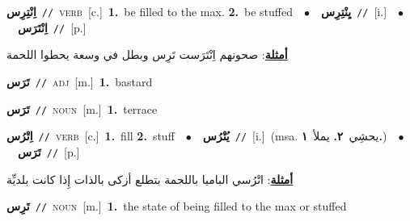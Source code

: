 \documentclass[10pt,a4paper,twoside]{article} %
\begin{document}
\begin{multicols}{2}
{{{{{\setlength\topsep{0pt}\textbf{\foreignlanguage{arabic}{اِنْتِرِس}}\ {\color{gray}\texttt{//}\color{black}}\ \textsc{verb}\ [c.]\ \textbf{1.}~be filled to the max.  \textbf{2.}~be stuffed\ \ $\bullet$\ \ \setlength\topsep{0pt}\textbf{\foreignlanguage{arabic}{يِنْتِرِس}}\ {\color{gray}\texttt{//}\color{black}}\ [i.]\ \ $\bullet$\ \ \setlength\topsep{0pt}\textbf{\foreignlanguage{arabic}{اِنْتَرَس}}\ {\color{gray}\texttt{//}\color{black}}\ [p.]\  \begin{flushright}\color{gray}\foreignlanguage{arabic}{\textbf{\underline{\foreignlanguage{arabic}{أمثلة}}}: صحونهم اِنْتَرَست تَرِس وبطل في وسعة يحطوا اللحمة}\end{flushright}\color{black}} \vspace{2mm}

{\setlength\topsep{0pt}\textbf{\foreignlanguage{arabic}{تَرَس}}\ {\color{gray}\texttt{//}\color{black}}\ \textsc{adj}\ [m.]\ \textbf{1.}~bastard\ 

{\setlength\topsep{0pt}\textbf{\foreignlanguage{arabic}{تَرَس}}\ {\color{gray}\texttt{//}\color{black}}\ \textsc{noun}\ [m.]\ \textbf{1.}~terrace\ 

{\setlength\topsep{0pt}\textbf{\foreignlanguage{arabic}{اِتْرُس}}\ {\color{gray}\texttt{//}\color{black}}\ \textsc{verb}\ [c.]\ \textbf{1.}~fill  \textbf{2.}~stuff\ \ $\bullet$\ \ \setlength\topsep{0pt}\textbf{\foreignlanguage{arabic}{يُتْرُس}}\ {\color{gray}\texttt{//}\color{black}}\ [i.]\ \color{gray}(msa. \foreignlanguage{arabic}{يحشِي}~\foreignlanguage{arabic}{\textbf{٢.}}  \foreignlanguage{arabic}{يملأ}~\foreignlanguage{arabic}{\textbf{١.}})\color{black}\ \ $\bullet$\ \ \setlength\topsep{0pt}\textbf{\foreignlanguage{arabic}{تَرَس}}\ {\color{gray}\texttt{//}\color{black}}\ [p.]\  \begin{flushright}\color{gray}\foreignlanguage{arabic}{\textbf{\underline{\foreignlanguage{arabic}{أمثلة}}}: اتْرُسي الباميا باللحمة بتطلع أزكى بالذات إِذا كانت بلديِّة}\end{flushright}\color{black}} \vspace{2mm}

{\setlength\topsep{0pt}\textbf{\foreignlanguage{arabic}{تَرِس}}\ {\color{gray}\texttt{//}\color{black}}\ \textsc{noun}\ [m.]\ \textbf{1.}~the state of being filled to the max or stuffed\ 

}}}}}}}
\end{multicols}
\end{document}
